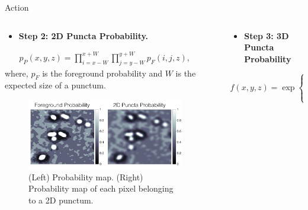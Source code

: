 \documentclass[final, table]{beamer}
\newlength{\sepwid}
\newlength{\onecolwid}
\newlength{\twocolwid}
\begin{document}
\begin{frame}[t]
\begin{columns}[t]
\begin{column}{\twocolwid}
\begin{block}{Action}
\begin{columns}[t]
\begin{column}{\onecolwid}

\begin{itemize} 
\item \textbf{Step 2: 2D Puncta Probability.}  %
\end{itemize} 


\begin{align} 
p_P(x, y, z) = \prod_{i=x-W}^{x+W} \prod_{j=y-W}^{y+W} p_F(i,j, z),
\end{align} 
where, $p_F$ is the foreground probability and $W$ is the expected size of a punctum. 
\begin{figure}[!h]
\includegraphics[width=1\textwidth]{figs/prob_conv}
\caption{(Left) Probability map. (Right) Probability map of each pixel belonging to a 2D punctum.}
\label{fig:prob_conv}
\end{figure}


\end{column}


\begin{column}{\sepwid}\end{column}  %
\begin{column}{\onecolwid}
\begin{itemize} 
\item \textbf{Step 3: 3D Puncta Probability} %
\end{itemize} 

\begin{equation} 
f(x, y, z) = \exp \left \{- \sum_{j=j_{start}}^{j=j_{end}} [p_P(x, y, z) - p_P(x, y, z+j)]^2 \right \}
\label{eq:factor}
\end{equation} 


\end{column}
\end{columns}
\end{block}
\end{column}
\end{columns}
\end{frame}
\end{document}
